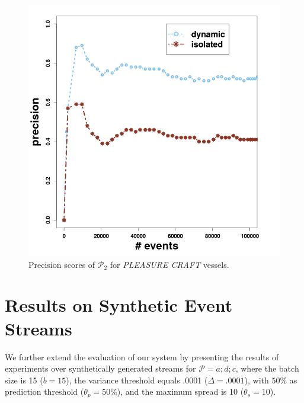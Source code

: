 \begin{figure}[H]
	
	\includegraphics[width=\textwidth,height=.62\textheight]{chapters/figures/synopses/p2_precision_100_2_08.png}
	
	\caption{Precision scores of $\mathcal{P}_2$  for \textit{PLEASURE CRAFT} vessels.}
	\label{fig:precsions_p2}
\end{figure}

\section{Results on Synthetic Event Streams}
\label{sec:results_synthetic}

We further extend the evaluation of our system by presenting the results of experiments over synthetically generated streams for $\mathcal{P}=a ; d ; c$, where the batch size is 15 ($b=15$), the variance threshold equals .0001 ($\Delta=.0001$), with $50\%$ as \pmcmr prediction threshold ($\theta_{p}=50\%$), and the maximum spread is 10 ($\theta_{s}=10$).

